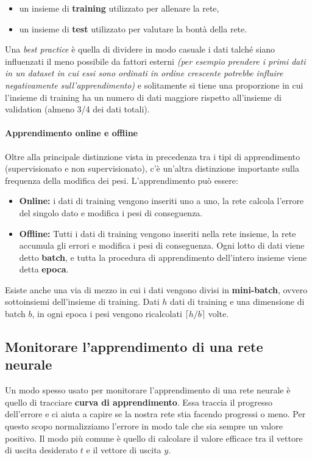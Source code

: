 \documentclass[12pt, twoside, letterpaper]{report}
\begin{document}
			\begin{itemize}
				\item un insieme di \textbf{training} utilizzato per allenare la rete,
				\item un insieme di \textbf{test} utilizzato per valutare la bontà della rete.
			\end{itemize}
			Una \textit{best practice} è quella di dividere in modo casuale i dati talché siano influenzati il meno possibile da fattori esterni \textit{(per esempio prendere i primi dati in un dataset in cui essi sono ordinati in ordine crescente potrebbe influire negativamente sull'apprendimento)} e solitamente si tiene una proporzione in cui l'insieme di training ha un numero di dati maggiore rispetto all'insieme di validation (almeno 3/4 dei dati totali). 

			\paragraph{Apprendimento online e offline} Oltre alla principale distinzione vista in precedenza tra i tipi di apprendimento (supervisionato e non supervisionato), c'è un'altra distinzione importante sulla frequenza della modifica dei pesi. L'apprendimento può essere: 
				\begin{itemize}
					\item \textbf{Online:} i dati di training vengono inseriti uno a uno, la rete calcola l'errore del singolo dato e modifica i pesi di conseguenza.
					\item \textbf{Offline:} Tutti i dati di training vengono inseriti nella rete insieme, la rete accumula gli errori e modifica i pesi di conseguenza. Ogni lotto di dati viene detto \textbf{batch}, e tutta la procedura di apprendimento dell'intero insieme viene detta \textbf{epoca}.
				\end{itemize}
				Esiste anche una via di mezzo in cui i dati vengono divisi in \textbf{mini-batch}, ovvero sottoinsiemi dell'insieme di training. Dati $h$ dati di training e una dimensione di batch $b$, in ogni epoca i pesi vengono ricalcolati $\lceil h/b \rceil$ volte.
			
			\subsection{Monitorare l'apprendimento di una rete neurale}
				Un modo spesso usato per monitorare l'apprendimento di una rete neurale è quello di tracciare \textbf{curva di apprendimento}. Essa traccia il progresso dell'errore e ci aiuta a capire se la nostra rete stia facendo progressi o meno. Per questo scopo normalizziamo l'errore in modo tale che sia sempre un valore positivo. Il modo più comune è quello di calcolare il valore efficace tra il vettore di uscita desiderato $t$ e il vettore di uscita $y$. 
\end{document}
